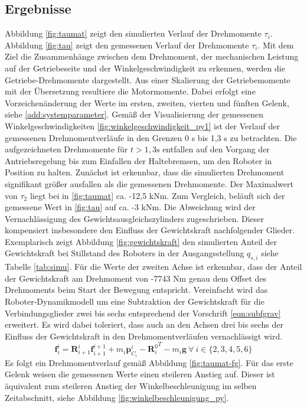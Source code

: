 \subsection{Ergebnisse}
Abbildung \ref{fig:taumat} zeigt den simulierten Verlauf der Drehmomente $\tau_i$. Abbildung \ref{fig:tau} zeigt den gemessenen Verlauf der Drehmomente $\tau_i$.  Mit dem Ziel die Zusammenhänge zwischen dem Drehmoment, der mechanischen Leistung auf der Getriebeseite und der Winkelgeschwindigkeit zu erkennen, werden die Getriebe-Drehmomente dargestellt. Aus einer Skalierung der Getriebemomente mit der Übersetzung resultiere die Motormomente. Dabei erfolgt eine Vorzeichenänderung der Werte im ersten, zweiten, vierten und fünften Gelenk, siehe \ref{add:systemparameter}.
%
Gemäß der Visualisierung der gemessenen Winkelgeschwindigkeiten \ref{fig:winkelgeschwindigkeit_py1} ist der Verlauf der gemessenen Drehmomentverläufe in den Grenzen 0 s bis 1,3 s zu betrachten. Die aufgezeichneten Drehmomente für $t>1,3\text{s}$ entfallen auf den Vorgang der Antriebsregelung bis zum Einfallen der Haltebremsen, um den Roboter in Position zu halten. 
%
Zunächst ist erkennbar, dass die simulierten Drehmoment signifikant größer ausfallen als die gemessenen Drehmomente. Der Maximalwert von $\tau_2$ liegt bei in \ref{fig:taumat} ca. -12,5 kNm. Zum Vergleich, beläuft sich der gemessene Wert in \ref{fig:tau} auf ca. -3 kNm. Die Abweichung wird der Vernachlässigung des Gewichtsausgleichszylinders zugeschrieben. Dieser kompensiert insbesondere den Einfluss der Gewichtskraft nachfolgender Glieder. Exemplarisch zeigt Abbildung \ref{fig:gewichtskraft} den simulierten Anteil der Gewichtskraft bei Stillstand des Roboters in der Ausgangsstellung $q_{s,i}$ siehe Tabelle \ref{tab:simu}. Für die Werte der zweiten Achse ist erkennbar, dass der Anteil der Gewichtskraft am Drehmoment von -7743 Nm genau dem  Offset des Drehmoments beim Start der Bewegung entspricht.
Vereinfacht wird das Roboter-Dynamikmodell um eine Subtraktion der Gewichtskraft für die Verbindungsglieder zwei bis sechs entsprechend der Vorschrift \ref{eqn:subfgrav} erweitert. Es wird dabei toleriert, dass auch an den Achsen drei bis sechs der Einfluss der Gewichtskraft in den Drehmomentverläufen vernachlässigt wird.
%
\begin{equation}
	\label{eqn:rnea4}
	\bm{f}^{i}_{i} = \bm{R}^{i}_{i+1} \bm{f}^{i+1}_{i+1} + m_i\ddot{\bm{p}}^{i}_{C_i} - {\bm{R}^0_i}^T - m_i \bm{g} ~\forall ~i \in \{2, 3, 4, 5, 6\}
\end{equation}
%
Es folgt ein Drehmomentverlauf gemäß Abbildung \ref{fig:taumat-fg}. Für das erste Gelenk weisen die gemessenen Werte einen steileren Anstieg auf. Dieser ist äquivalent zum steileren Anstieg der Winkelbeschleunigung im selben Zeitabschnitt, siehe Abbildung \ref{fig:winkelbeschleunigung_py}. 
